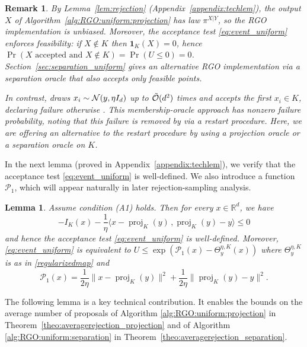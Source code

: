 \documentclass[11pt,letterpaper]{article}
\newcommand{\R}{\mathbb{R}}
\newcommand{\proj}{\operatorname{proj}}
\newcommand{\inner}[2]{\langle #1\,,#2 \rangle}
\newtheorem{lemma}[thm]{Lemma}
\newtheorem{remark}[thm]{Remark}
\begin{document}
\begin{remark}
\label{remark:feasible} 
By Lemma~\ref{lem:rejection} (Appendix~\ref{appendix:techlem}), the output $X$ of Algorithm~\ref{alg:RGO:uniform:projection} has law $\pi^{X|Y}$, so the RGO implementation is unbiased. Moreover, the acceptance test \eqref{eq:event_uniform} enforces feasibility: if $X\notin K$ then $\mathbf{1}_K(X)=0$, hence $\Pr(\text{$X$ accepted and }X\notin K)=\Pr(U\le 0)=0$. Section~\ref{sec:separation_uniform} gives an alternative RGO implementation via a separation oracle that also accepts only feasible points.

In contrast, \cite{kook2024inandout} draws $x_i\sim{\cal N}(y,\eta I_d)$ up to $\tilde{\cal O}(d^2)$ times and accepts the first $x_i\in K$, declaring failure otherwise \cite[Remark~2]{kook2024inandout}. This membership-oracle approach has nonzero failure probability, noting that this failure is removed by \cite{kook2025zeroth} via a \textit{restart} procedure.  Here, we are offering an alternative to the \textit{restart} procedure by using a projection oracle or a separation oracle on $K$.

\end{remark}


In the next lemma (proved in Appendix~\ref{appendix:techlem}), we verify that the acceptance test \eqref{eq:event_uniform} is well-defined. We also introduce a function $\mathcal{P}_1$, which will appear naturally in later rejection-sampling analysis.


\begin{lemma}\label{lem:compareP1} 
Assume condition (A1) holds. Then for every $x\in \R^d$, we have 
\[ -I_K(x)-\frac{1}{\eta}\inner{x-\proj_K(y)}{\proj_K(y)-y} \le 0\]
and hence the acceptance test \eqref{eq:event_uniform} is well-defined.
Moreover, \eqref{eq:event_uniform} is equivalent to  $U \le \exp(\mathcal{P}_1(x)- \Theta_y^{\eta,K}(x))$
where $\Theta_y^{\eta,K}$ is as in \eqref{regularizedmap} and 
\begin{equation}\label{def:P1}
    \mathcal{P}_1(x)
    = \frac{1}{2\eta}\|x-\proj_K(y)\|^2 + \frac{1}{2\eta}\|\proj_K(y)-y\|^2. 
\end{equation}
\end{lemma}



The following lemma is a key technical contribution. It enables the bounds on the average number of proposals of Algorithm \ref{alg:RGO:uniform:projection} in Theorem~\ref{theo:averagerejection_projection} and of Algorithm \ref{alg:RGO:uniform:separation} in Theorem~\ref{theo:averagerejection_separation}. 
\end{document}
